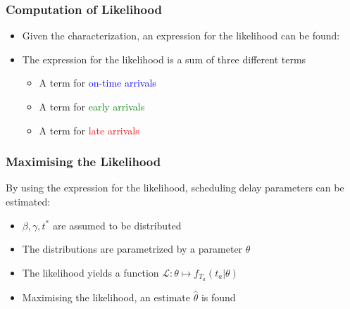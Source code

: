 \documentclass[hyperref={pdfpagelabels=false}]{beamer}
\begin{document}
\begin{frame}
  \frametitle{Computation of Likelihood}
  \begin{itemize}
  \item Given the characterization, an expression for the likelihood can be found:
  \item<2-> The expression for the likelihood is a sum of three different terms
    \begin{itemize}
    \item<2-> A term for \textcolor{blue}{on-time arrivals}
    \item<2-> A term for \textcolor{green}{early arrivals}
    \item<2-> A term for \textcolor{red}{late arrivals}
    \end{itemize}
  \end{itemize}
\end{frame}

\begin{frame}
  \frametitle{Maximising the Likelihood}
  By using the expression for the likelihood,
  scheduling delay parameters can be estimated:
  \begin{itemize}
  \item<2-> \(\beta, \gamma, t^*\) are assumed to be distributed
  \item<2-> The distributions are parametrized by a parameter \(\theta\)
  \item<3-> The likelihood yields a function \(\mathcal{L} : \theta \mapsto f_{T_a}(t_a | \theta)\)
  \item<4-> Maximising the likelihood, an estimate \(\hat{\theta}\) is found
  \end{itemize}
\end{frame}
\end{document}
